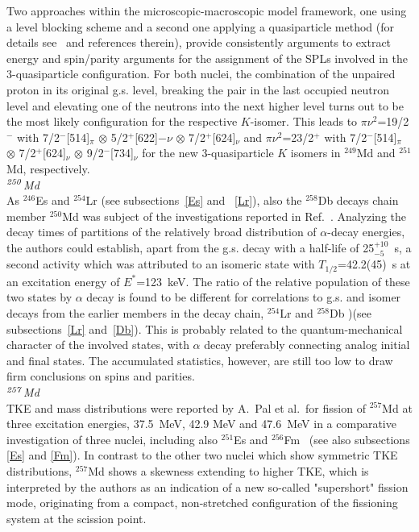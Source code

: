 Two approaches within the microscopic-macroscopic model framework, one using a level blocking scheme and a second one applying a quasiparticle method (for details see~\cite{Goigoux2021} and references therein), provide consistently arguments to extract energy and spin/parity arguments for the assignment of the SPLs involved in the 3-quasiparticle configuration.  
For both nuclei, the combination of the unpaired proton in its original g.s. level, breaking the pair in the last occupied neutron level and elevating one of the neutrons into the next higher level turns out to be the most likely configuration for the respective $K$-isomer. 
This leads to $\pi\nu^2$=19/2$^-$ with 7/2$^-$[514]$_\pi$ $\otimes$ 5/2$^+$[622]$-\nu$ $\otimes$ 7/2$^+$[624]$_\nu$ and $\pi\nu^2$=23/2$^+$ with 7/2$^-$[514]$_\pi$ $\otimes$ 7/2$^+$[624]$_\nu$ $\otimes$ 9/2$^-$[734]$_\nu$ for the new 3-quasiparticle $K$ isomers in $^{249}$Md and $^{251}$Md, respectively.\\

{\it $^{\it250}$Md}\\
As $^{246}$Es  and $^{254}$Lr (see subsections~\ref{Es} and ~\ref{Lr}), also the $^{258}$Db decays chain member $^{250}$Md was subject of the investigations reported in Ref.~\cite{Vostinar2019}. Analyzing the decay times of partitions of the relatively broad distribution of $\alpha$-decay energies, the authors could establish, apart from the g.s. decay with a half-life of 25$^{+10}_{-5}$~s, a second activity which was attributed to an isomeric state with $T_{1/2}$=42.2(45)~s at an excitation energy of $E^*$=123~keV. 
The ratio of the relative population of these two states by $\alpha$ decay is found to be different for correlations to g.s. and isomer decays from the earlier members in the decay chain, $^{254}$Lr and $^{258}$Db )(see subsections~\ref{Lr} and~\ref{Db}).
This is probably related to the quantum-mechanical character of the involved states, with $\alpha$ decay preferably connecting analog initial and final states. The accumulated statistics, however, are still too low to draw firm conclusions on spins and parities.\\

{\it $^{\it257}$Md}\\ 
TKE and mass distributions were reported by A.~Pal et al.~for fission of $^{257}$Md at three excitation energies, 37.5~MeV, 42.9 MeV and 47.6~MeV in a comparative investigation of three nuclei, including also $^{251}$Es and $^{256}$Fm~\cite{Pal2021} (see also subsections \ref{Es} and \ref{Fm}). In contrast to the other two nuclei which show symmetric TKE distributions, $^{257}$Md shows a skewness extending to higher TKE, which is interpreted by the authors as an indication of a new so-called "supershort" fission mode, originating from a compact, non-stretched configuration of the fissioning system at the scission point.


